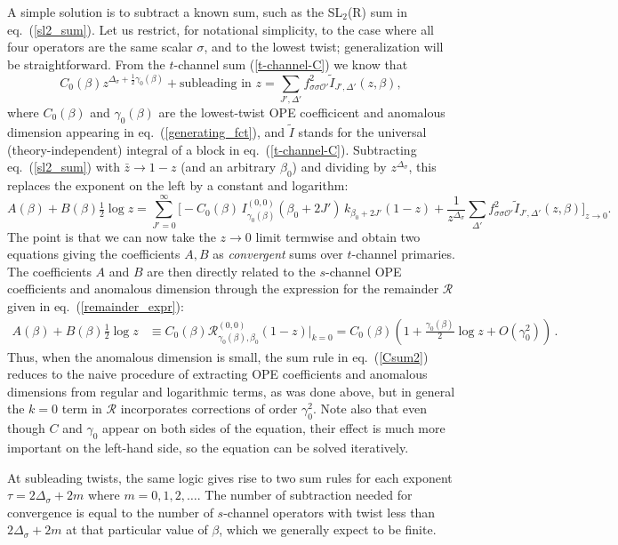 \documentclass[11pt, reqno,preprint]{article}
\def\be{\begin{equation}}
\def\ee{\end{equation}}
\def\OO{\mathcal{O}}
\def\zbar{\bar{z}}
\def\j{J}
\begin{document}
A simple solution is to subtract a known sum, such as the SL${}_2$(R) sum in eq.~(\ref{sl2_sum}).
Let us restrict, for notational simplicity, to the case where all four operators are the same scalar
$\sigma$, and to the lowest twist; generalization will be straightforward.
From the $t$-channel sum (\ref{t-channel-C}) we know that
\be
 C_0(\beta) z^{\Delta_\sigma+\frac12\gamma_0(\beta)}+\mbox{subleading in $z$}
 = \sum_{\j',\Delta'} f_{\sigma\sigma\OO'}^2\tilde{I}_{\j',\Delta'}(z,\beta), \label{Csum1}
\ee
where $C_0(\beta)$ and $\gamma_0(\beta)$ are the lowest-twist OPE coefficicent and anomalous dimension
appearing in eq.~(\ref{generating_fct}),
and $\tilde{I}$ stands for the universal (theory-independent) integral of a block in eq.~(\ref{t-channel-C}).
Subtracting eq.~(\ref{sl2_sum}) with $\zbar\to 1{-}z$ (and an arbitrary $\beta_0$) and dividing by $z^{\Delta_\sigma}$,
this replaces the exponent on the left by  a constant and logarithm:
\be
A(\beta)+B(\beta)\tfrac12\log z
=
\sum_{\j'=0}^\infty \Bigg[
-C_0(\beta)\, I^{(0,0)}_{\gamma_0(\beta)}\!(\beta_0{+}2\j')\,k_{\beta_0{+}2\j'}(1{-}z)
+
\frac{1}{z^{\Delta_\sigma}}\sum_{\Delta'}f_{\sigma\sigma\OO'}^2\tilde{I}_{\j',\Delta'}(z,\beta)
\Bigg]_{z\to 0}.
\label{Csum2}
\ee
The point is that we can now take the $z\to 0$ limit termwise and obtain two equations
giving the coefficients $A,B$ as \emph{convergent} sums over $t$-channel primaries.
The coefficients $A$ and $B$ are then directly related to the $s$-channel OPE coefficients and anomalous dimension
through the expression for the remainder $\mathcal{R}$ given in eq.~(\ref{remainder_expr}):
\be\begin{aligned}
 A(\beta)+B(\beta)\tfrac12\log z &\equiv C_0(\beta)\mathcal{R}_{\gamma_0(\beta),\beta_0}^{(0,0)}(1-z)\Big|_{k=0}
= C_0(\beta)\left(1+\tfrac{\gamma_0(\beta)}{2}\log z+ O(\gamma_0^2)\right) \,. \label{sum_rule}
\end{aligned}\ee
Thus, when the anomalous dimension is small, the sum rule in eq.~(\ref{Csum2}) reduces to the naive procedure of
extracting OPE coefficients and anomalous dimensions from regular and logarithmic terms, as was done above,
but in general the $k=0$ term in $\mathcal{R}$ incorporates corrections of order $\gamma_0^2$.
Note also that even though $C$ and $\gamma_0$ appear on both sides of the equation, their effect is much more important
on the left-hand side, so the equation can be solved iteratively.

At subleading twists, the same logic gives rise to two sum rules for each exponent $\tau=2\Delta_\sigma+2m$ where $m=0,1,2,\ldots$.
The number of subtraction needed for convergence is equal to the number of $s$-channel
operators with twist less than $2\Delta_\sigma+2m$ at that particular value of $\beta$, which we generally expect to be finite.
\end{document}
